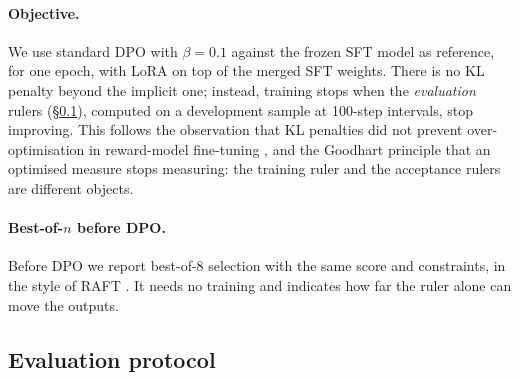 \paragraph{Objective.}
We use standard DPO \citep{rafailov2023dpo} with $\beta = 0.1$ against the frozen SFT model as reference, for one epoch, with LoRA on top of the merged SFT weights.
There is no KL penalty beyond the implicit one; instead, training stops when the \emph{evaluation} rulers (\S\ref{sec:eval}), computed on a development sample at 100-step intervals, stop improving.
This follows the observation that KL penalties did not prevent over-optimisation in reward-model fine-tuning \citep{gao2023scaling}, and the Goodhart principle that an optimised measure stops measuring: the training ruler and the acceptance rulers are different objects.

\paragraph{Best-of-$n$ before DPO.}
Before DPO we report best-of-8 selection with the same score and constraints, in the style of RAFT \citep{dong2023raft}.
It needs no training and indicates how far the ruler alone can move the outputs.

\subsection{Evaluation protocol}
\label{sec:eval}

